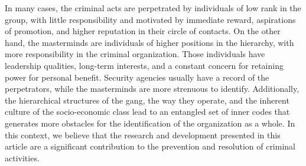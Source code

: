 
In many cases, the criminal acts are perpetrated by individuals of low rank in the group, with little responsibility and motivated by immediate reward, aspirations of promotion, and higher reputation in their circle of contacts. On the other hand, the masterminds are individuals of higher positions in the hierarchy, with more responsibility in the criminal organization. Those individuals have leadership qualities, long-term interests, and a constant concern for retaining power for personal benefit. Security agencies usually have a record of the perpetrators, while the masterminds are more strenuous to identify. Additionally, the hierarchical structures of the gang, the way they operate, and the inherent culture of the socio-economic class lead to an entangled set of inner codes that generates more obstacles for the identification of the organization as a whole. In this context, we believe that the research and development presented in this article are a significant contribution to the prevention and resolution of criminal activities.


